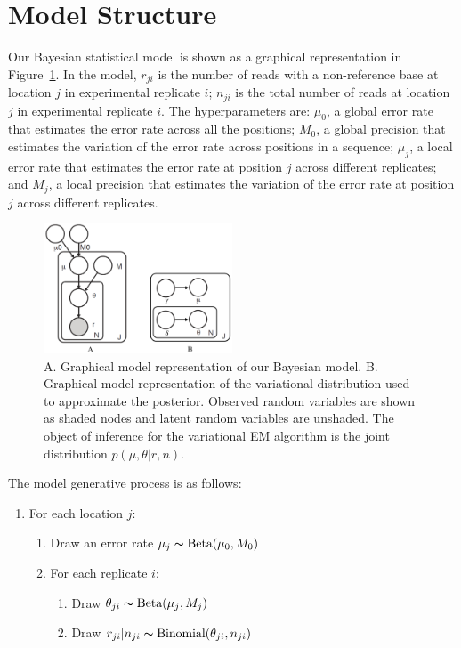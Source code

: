 \documentclass[11pt,reqno]{amsart}
\begin{document}
\section{Model Structure}
Our Bayesian statistical model is shown as a graphical representation in Figure~\ref{tbl:graphical_model}.
In the model, $r_{ji}$ is the number of reads with a non-reference base at location $j$ in experimental replicate $i$; $n_{ji}$ is the total number of reads at location $j$ in experimental replicate $i$.
The hyperparameters are:
$\mu_0$, a global error rate that estimates the error rate across all the positions;
$M_0$, a global precision that estimates the variation of the error rate across positions in a sequence;
$ \mu_j $, a local error rate that estimates the error rate at position $j$ across different replicates;
and $M_j$, a local precision that estimates the variation of the error rate at position $j$ across different replicates.
\begin{figure}[htpb]
\centering
\includegraphics[width=0.5\textwidth]{figs/rvd3_model.png}
\caption{A. Graphical model representation of our Bayesian model.
B. Graphical model representation of the variational distribution used to approximate the posterior.
Observed random variables are shown as shaded nodes and latent random variables are unshaded.
The object of inference for the variational EM algorithm is the joint distribution $p(\mu, \theta|r, n)$.}
\label{tbl:graphical_model}
\end{figure}
The model generative process is as follows:
\begin{enumerate}[noitemsep]
    \item For each location $j$:
	\begin{enumerate}
		\item Draw an error rate $\mu_j \thicksim \text{Beta}(\mu_0, M_0)$
		\item For each replicate $i$:
		\begin{enumerate}
			\item Draw $\theta_{ji} \thicksim \text{Beta}(\mu_j, M_j)$
			\item Draw $r_{ji} | n_{ji} \thicksim \text{Binomial}(\theta_{ji}, n_{ji})$
		\end{enumerate}
	\end{enumerate}
\end{enumerate}
\end{document}
